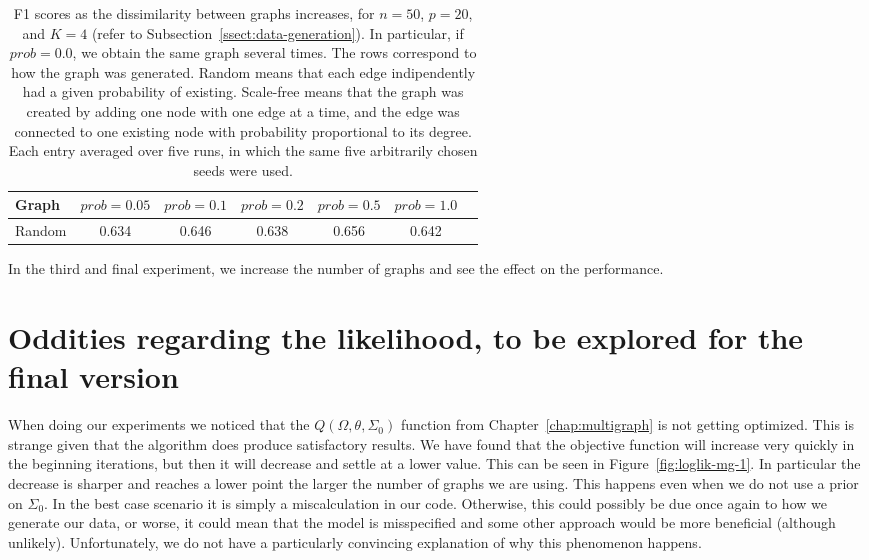 \documentclass[a4paper, 11pt, oneside]{report}
\newcommand{\1}{\mathds{1}}
\begin{document}
\begin{table}[ht]
  \caption{F1 scores as the dissimilarity between graphs increases, for $n=50$, $p=20$, and $K=4$ (refer to Subsection~\ref{ssect:data-generation}). 
    In particular, if $prob = 0.0$, we obtain the same graph several times.
    The rows correspond to how the graph was generated.
    Random means that each edge indipendently had a given probability of existing.
Scale-free means that the graph was created by adding one node with one edge at a time, and the edge was connected to one existing node with probability proportional to its degree.
    Each entry averaged over five runs, in which the same five arbitrarily chosen seeds were used.
  }
  \label{tab:mg-more-random}
  \begin{center}
    \begin{tabular}[c]{l|cccccc}
      \toprule
      Graph  & $prob = 0.05$ & $prob = 0.1$ & $prob = 0.2$ & $prob = 0.5$ & $prob = 1.0$ \\
      \midrule
      Random  & 0.634 & 0.646 & 0.638 & 0.656 & 0.642 \\
      \bottomrule
    \end{tabular}
  \end{center}
\end{table}

In the third and final experiment, we increase the number of graphs and see the effect on the performance.
\section{Oddities regarding the likelihood, to be explored for the final version}
When doing our experiments we noticed that the $Q(\Omega, \theta, \Sigma_0)$ function from Chapter~\ref{chap:multigraph}
is not getting optimized. This is strange given that the algorithm does produce satisfactory results.
We have found that the objective function will increase very quickly in the beginning iterations,
but then it will decrease and settle at a lower value. This can be seen in Figure~\ref{fig:loglik-mg-1}.
In particular the decrease is sharper and reaches a lower point the larger the number of graphs we are using.
This happens even when we do not use a prior on $\Sigma_0$.
In the best case scenario it is simply a miscalculation in our code.
Otherwise, this could possibly be due once again to how we generate our data, or worse,
it could mean that the model is misspecified and some other approach would be more beneficial (although unlikely).
Unfortunately, we do not have a particularly convincing explanation of why this phenomenon happens.
\end{document}
